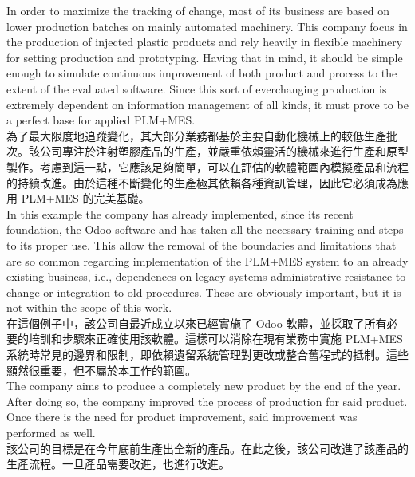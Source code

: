 \fontsize{14pt}{2.5pt}\sectionef 
{In order to maximize the tracking of change, most of its business are based on lower production batches on mainly automated machinery. This company focus in the production of injected plastic products and rely heavily in flexible machinery for setting production and prototyping. Having that in mind, it should be simple enough to simulate continuous improvement of both product and process to the extent of the evaluated software. Since this sort of everchanging production is extremely dependent on information management of all kinds, it must prove to be a perfect base for applied PLM+MES.}\\[5pt]

\fontsize{14pt}{5pt}\sectionef
 {為了最大限度地追蹤變化，其大部分業務都基於主要自動化機械上的較低生產批次。該公司專注於注射塑膠產品的生產，並嚴重依賴靈活的機械來進行生產和原型製作。考慮到這一點，它應該足夠簡單，可以在評估的軟體範圍內模擬產品和流程的持續改進。由於這種不斷變化的生產極其依賴各種資訊管理，因此它必須成為應用 PLM+MES 的完美基礎。}\\[15pt]

\fontsize{14pt}{2.5pt}\sectionef 
{In this example the company has already implemented, since its recent foundation, the Odoo software and has taken all the necessary training and steps to its proper use. This allow the removal of the boundaries and limitations that are so common regarding implementation of the PLM+MES system to an already existing business, i.e., dependences on legacy systems administrative resistance to change or integration to old procedures. These are obviously important, but it is not within the scope of this work.}\\[10pt]

\fontsize{14pt}{5pt}\sectionef
 {在這個例子中，該公司自最近成立以來已經實施了 Odoo 軟體，並採取了所有必要的培訓和步驟來正確使用該軟體。這樣可以消除在現有業務中實施 PLM+MES 系統時常見的邊界和限制，即依賴遺留系統管理對更改或整合舊程式的抵制。這些顯然很重要，但不屬於本工作的範圍。}\\[15pt]

\fontsize{14pt}{2.5pt}\sectionef 
{The company aims to produce a completely new product by the end of the year. After doing so, the company improved the process of production for said product. Once there is the need for product improvement, said improvement was performed as well.}\\[10pt]

\fontsize{14pt}{5pt}\sectionef
 {該公司的目標是在今年底前生產出全新的產品。在此之後，該公司改進了該產品的生產流程。一旦產品需要改進，也進行改進。}\\[15pt]

